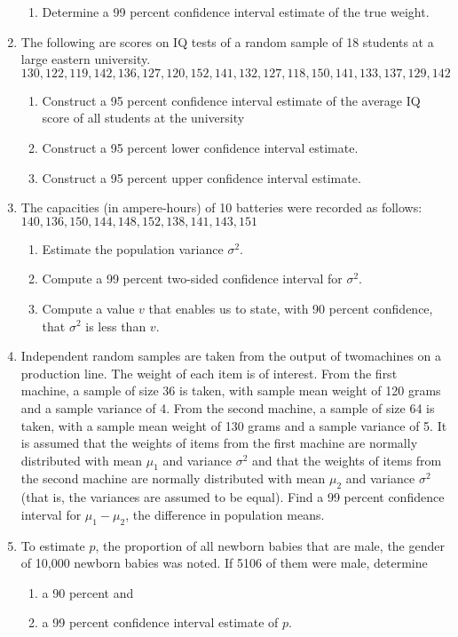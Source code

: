 \documentclass{article}
\begin{document}
\begin{enumerate}
\begin{enumerate}
        \item Determine a 99 percent confidence interval estimate of the true weight.
    \end{enumerate}
    \item  The following are scores on IQ tests of a random sample of 18 students at a large eastern university.
    $130, 122, 119, 142, 136, 127, 120, 152, 141, 132, 127, 118, 150, 141, 133, 137, 129, 142$
    \begin{enumerate}
        \item Construct a 95 percent confidence interval estimate of the average IQ score of all students at the university
        \item Construct a 95 percent lower confidence interval estimate.
        \item Construct a 95 percent upper confidence interval estimate.
    \end{enumerate}
    \item The capacities (in ampere-hours) of 10 batteries were recorded as follows:
    $140, 136, 150, 144, 148, 152, 138, 141, 143, 151$
    \begin{enumerate}
        \item Estimate the population variance $\sigma^2$.
        \item Compute a 99 percent two-sided confidence interval for $\sigma^2$.
        \item Compute a value $v$ that enables us to state, with 90 percent confidence, that $\sigma^2$ is less than $v$.
    \end{enumerate}
    \item Independent random samples are taken from the output of twomachines on a production line. 
    The weight of each item is of interest. From the first machine, a sample of size 36 is taken, with sample mean weight of 120 grams and a sample variance of 4.
    From the second machine, a sample of size 64 is taken, with a sample mean weight of 130 grams and a sample variance of 5.
    It is assumed that the weights of items from the first machine are normally distributed with mean $\mu_1$ and variance $\sigma^2$ and that the weights of items from the second machine are normally distributed with mean $\mu_2$ and variance $\sigma^2$ (that is, the variances are assumed to be equal). 
    Find a 99 percent confidence interval for $\mu_1 - \mu_2$, the difference in population means.
    \item  To estimate $p$, the proportion of all newborn babies that are male, the gender of 10,000 newborn babies was noted. If 5106 of them were male, determine
    \begin{enumerate}
        \item a 90 percent and
        \item a 99 percent confidence interval estimate of $p$.
    \end{enumerate}
\end{enumerate}
\end{document}

